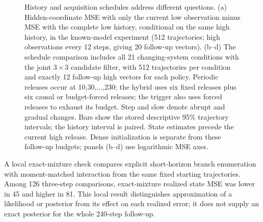 \documentclass[11pt,a4paper]{article}
\begin{document}
\begin{figure}[p]
\caption{History and acquisition schedules address different questions. (a) Hidden-coordinate MSE with only the current low observation minus MSE with the complete low history, conditional on the same high history, in the known-model experiment (512 trajectories; high observations every 12 steps, giving 20 follow-up vectors). (b--d) The schedule comparison includes all 21 changing-system conditions with the joint $3\times3$ candidate filter, with 512 trajectories per condition and exactly 12 follow-up high vectors for each policy. Periodic releases occur at 10,30,...,230; the hybrid uses six fixed releases plus six causal or budget-forced releases; the trigger also uses forced releases to exhaust its budget. Step and slow denote abrupt and gradual changes. Bars show the stored descriptive 95\% trajectory intervals; the history interval is paired. State estimates precede the current high release. Dense initialization is separate from these follow-up budgets; panels (b--d) use logarithmic MSE axes.}
\label{fig:dynamics-history-schedules}
\end{figure}

A local exact-mixture check compares explicit short-horizon branch enumeration with moment-matched interaction from the same fixed starting trajectories. Among 126 three-step comparisons, exact-mixture realized state MSE was lower in 45 and higher in 81. This local result distinguishes approximation of a likelihood or posterior from its effect on each realized error; it does not supply an exact posterior for the whole 240-step follow-up.
\end{document}
